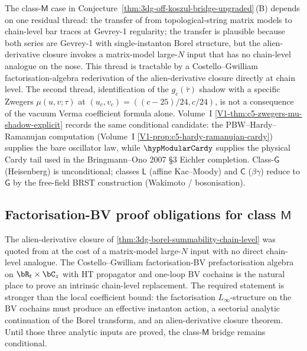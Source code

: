 \begin{remark}
\label{rem:3dg-off-koszul-remaining-conditionals}
%
%
The class-$\mathsf M$ case in
Conjecture~\ref{thm:3dg-off-koszul-bridge-upgraded}\,\textup{(B)}
depends on one residual thread: the transfer of
\cite[Thm.~3.1]{AnicetoSchiappa2015} from topological-string matrix
models to chain-level bar traces at Gevrey-1 regularity; the
transfer is plausible because both series are Gevrey-1 with
single-instanton Borel structure, but the alien-derivative closure
invokes a matrix-model large-$N$ input that has no chain-level
analogue on the nose. This thread is tractable by a
Costello--Gwilliam factorisation-algebra rederivation of the
alien-derivative closure directly at chain level.
The second thread, identification of the $g_c(\bar\tau)$ shadow
with a specific Zwegers $\mu(u, v; \tau)$ at
$(u_c, v_c) = ((c-25)/24, c/24)$, is not a consequence of the
vacuum Verma coefficient formula alone. Volume~I
\autoref{V1-thm:c5-zwegers-mu-shadow-explicit} records the same
conditional candidate: the PBW--Hardy--Ramanujan computation
(Volume~I \autoref{V1-prop:c5-hardy-ramanujan-cardy}) supplies the bare
oscillator law, while \(\hypModularCardy\) supplies the physical Cardy
tail used in the Bringmann--Ono 2007 \S 3 Eichler completion.
Class-$\mathsf G$ (Heisenberg) is unconditional; classes $\mathsf L$
(affine Kac--Moody) and $\mathsf C$ ($\beta\gamma$) reduce to
$\mathsf G$ by the free-field BRST construction
(Wakimoto / bosonisation).
\end{remark}

\subsection{Factorisation-BV proof obligations for class $\mathsf M$}
\label{subsec:3dg-fact-bv-asv-unconditional}
%
%
%
%

The alien-derivative closure of
\autoref{thm:3dg-borel-summability-chain-level} was quoted from
\cite[Thm.~3.1]{AnicetoSchiappa2015} at the cost of a matrix-model
large-$N$ input with no direct chain-level analogue. The
Costello--Gwilliam factorisation-BV prefactorisation algebra on
$\bR_{t}\times\bC_{z}$ with HT propagator and one-loop BV cochains
is the natural place to prove an
intrinsic chain-level replacement. The required statement is stronger
than the local coefficient bound: the factorisation
$L_{\infty}$-structure on the BV cochains must produce an effective
instanton action, a sectorial analytic continuation of the Borel
transform, and an alien-derivative closure theorem. Until those three
analytic inputs are proved, the class-$\mathsf M$ bridge remains
conditional.

